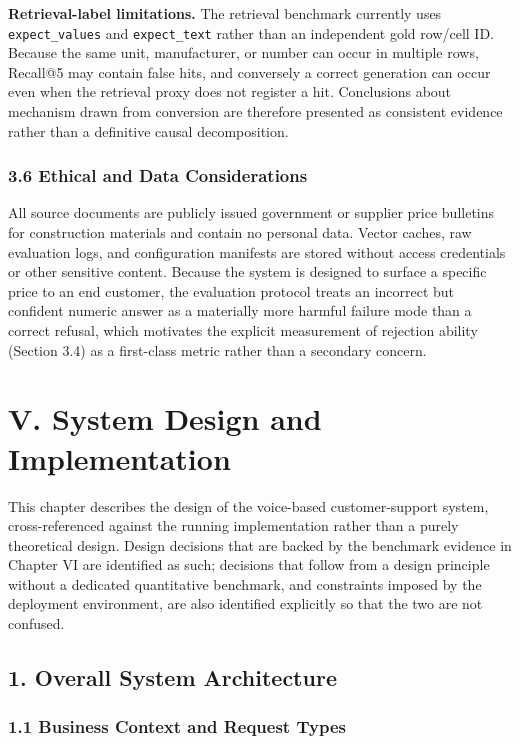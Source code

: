 \documentclass[11pt,a4paper]{article}
\newcommand{\chapterstart}[1]{\clearpage\section{#1}}
\begin{document}
\textbf{Retrieval-label limitations.} The retrieval benchmark currently uses
\texttt{expect\_values} and \texttt{expect\_text} rather than an independent
gold row/cell ID. Because the same unit, manufacturer, or number can occur in
multiple rows, Recall@5 may contain false hits, and conversely a correct
generation can occur even when the retrieval proxy does not register a hit.
Conclusions about mechanism drawn from conversion are therefore presented as
consistent evidence rather than a definitive causal decomposition.

\subsubsection{3.6 Ethical and Data Considerations}

All source documents are publicly issued government or supplier price
bulletins for construction materials and contain no personal data. Vector
caches, raw evaluation logs, and configuration manifests are stored without
access credentials or other sensitive content. Because the system is
designed to surface a specific price to an end customer, the evaluation
protocol treats an incorrect but confident numeric answer as a materially
more harmful failure mode than a correct refusal, which motivates the
explicit measurement of rejection ability (Section 3.4) as a first-class
metric rather than a secondary concern.

\chapterstart{V. System Design and Implementation}

This chapter describes the design of the voice-based customer-support system,
cross-referenced against the running implementation rather than a purely
theoretical design. Design decisions that are backed by the benchmark
evidence in Chapter VI are identified as such; decisions that follow from a
design principle without a dedicated quantitative benchmark, and constraints
imposed by the deployment environment, are also identified explicitly so
that the two are not confused.

\subsection{1. Overall System Architecture}

\subsubsection{1.1 Business Context and Request Types}
\end{document}
